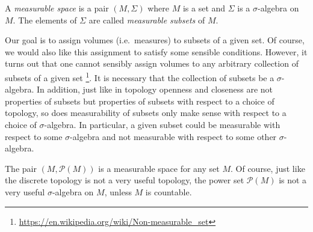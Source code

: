 \begin{definition}
A \emph{measurable space} is a pair $(M,\Sigma)$ where $M$ is a set
and $\Sigma$ is a $\sigma$-algebra on $M$. The elements of $\Sigma$
are called \emph{measurable subsets} of $M$.
\end{definition}

Our goal is to assign volumes (i.e.\ measures) to subsets of a given
set. Of course, we would also like this assignment to satisfy some
sensible conditions. However, it turns out that one cannot sensibly
assign volumes to any arbitrary collection of subsets of a given set%
\footnote{\url{https://en.wikipedia.org/wiki/Non-measurable_set}}.
It is necessary that the collection of subsets be a $\sigma$-algebra.
In addition, just like in topology openness and closeness are not
properties of subsets but properties of subsets with respect to a
choice of topology, so does measurability of subsets only make sense
with respect to a choice of $\sigma$-algebra. In particular, a given
subset could be measurable with respect to some $\sigma$-algebra and
not measurable with respect to some other $\sigma$-algebra.

\begin{example}
The pair $(M,\mathscr{P}(M))$ is a measurable space for any set $M$.
Of course, just like the discrete topology is not a very useful
topology, the power set $\mathscr{P}(M)$ is not a very useful
$\sigma$-algebra on $M$, unless $M$ is countable.
\end{example}

